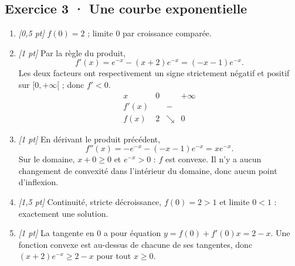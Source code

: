 \subsection*{Exercice 3 · Une courbe exponentielle}\begin{enumerate}

\item \textit{[0,5 pt]} $f(0)=2$ ; limite $0$ par croissance comparée.

\item \textit{[1 pt]} Par la règle du produit,
\[f'(x)=e^{-x}-(x+2)e^{-x}=(-x-1)e^{-x}.\]
Les deux facteurs ont respectivement un signe strictement négatif et positif sur $[0,+\infty[$ ; donc $f'<0$.
\[\begin{array}{c|ccc}x&0&&+\infty\\\hline f'(x)&&-&\\\hline f(x)&2&\searrow&0\end{array}\]

\item \textit{[1 pt]} En dérivant le produit précédent,
\[f''(x)=-e^{-x}-(-x-1)e^{-x}=xe^{-x}.\]
Sur le domaine, $x+0\ge0$ et $e^{-x}>0$ : $f$ est convexe. Il n'y a aucun changement de convexité dans l'intérieur du domaine, donc aucun point d'inflexion.

\item \textit{[1,5 pt]} Continuité, stricte décroissance, $f(0)=2>1$ et limite $0<1$ : exactement une solution.

\item \textit{[1 pt]} La tangente en $0$ a pour équation $y=f(0)+f'(0)x=2-x$. Une fonction convexe est au-dessus de chacune de ses tangentes, donc $(x+2)e^{-x}\ge 2-x$ pour tout $x\ge0$.

\end{enumerate}


